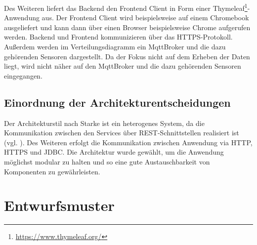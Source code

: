 \documentclass[runningheads]{llncs}
\begin{document}
Des Weiteren liefert das Backend den Frontend Client in Form einer Thymeleaf\footnote{\url{https://www.thymeleaf.org/}}-Anwendung aus.
Der Frontend Client wird beispielsweise auf einem Chromebook ausgeliefert und kann dann über einen Browser beispielsweise Chrome aufgerufen werden.
Backend und Frontend kommunizieren über das HTTPS-Protokoll.
Außerdem werden im Verteilungsdiagramm ein MqttBroker und die dazu gehörenden Sensoren dargestellt.
Da der Fokus nicht auf dem Erheben der Daten liegt, wird nicht näher auf den MqttBroker und die dazu gehörenden Sensoren eingegangen.

\subsection{Einordnung der Architekturentscheidungen}
Der Architekturstil nach Starke ist ein heterogenes System, da die Kommunikation zwischen den Services über REST-Schnittstellen realisiert ist (vgl. \cite{starke2015effektive}).
Des Weiteren erfolgt die Kommunikation zwischen Anwendung via HTTP, HTTPS und JDBC.
Die Architektur wurde gewählt, um die Anwendung möglichst modular zu halten und so eine gute Austauschbarkeit von Komponenten zu gewährleisten.

\newpage
\section{Entwurfsmuster}
\end{document}
